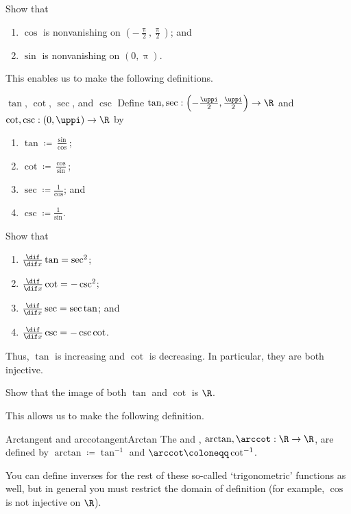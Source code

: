 \begin{exr}{}{}
Show that
\begin{enumerate}
\item $\cos$ is nonvanishing on $\left( -\frac{\uppi}{2},\frac{\uppi}{2}\right)$; and
\item $\sin$ is nonvanishing on $(0,\uppi )$.
\end{enumerate}
\end{exr}
This enables us to make the following definitions.
\begin{dfn}{$\tan$, $\cot$, $\sec$, and $\csc$}{}
Define $\tan ,\sec :\left( -\frac{\uppi}{2},\frac{\uppi}{2}\right) \rightarrow \R$ and $\cot ,\csc :(0,\uppi )\rightarrow \R$ by
\begin{enumerate}
\item $\tan \coloneqq \frac{\sin}{\cos}$;
\item $\cot \coloneqq \frac{\cos}{\sin}$;
\item $\sec \coloneqq \frac{1}{\cos}$; and
\item $\csc \coloneqq \frac{1}{\sin}$.
\end{enumerate}
\end{dfn}
\begin{exr}{}{}
Show that
\begin{enumerate}
\item $\frac{\dif}{\dif x}\tan =\sec ^2$;
\item $\frac{\dif}{\dif x}\cot =-\csc ^2$;
\item $\frac{\dif}{\dif x}\sec =\sec \tan$; and
\item $\frac{\dif}{\dif x}\csc =-\csc \cot$.
\end{enumerate}
\end{exr}
Thus, $\tan$ is increasing and $\cot$ is decreasing.  In particular, they are both injective.
\begin{exr}{}{}
Show that the image of both $\tan$ and $\cot$ is $\R$.
\end{exr}
This allows us to make the following definition.
\begin{dfn}{Arctangent and arccotangent}{Arctan}
The  and , $\arctan ,\arccot :\R \rightarrow \R$, are defined by $\arctan \coloneqq \tan ^{-1}$ and $\arccot \coloneqq \cot ^{-1}$.
\begin{rmk}
You can define inverses for the rest of these so-called `trigonometric' functions as well, but in general you must restrict the domain of definition (for example, $\cos$ is not injective on $\R$).
\end{rmk}
\end{dfn}
